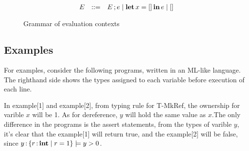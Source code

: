 \documentclass[runningheads]{llncs}
\begin{document}
\begin{figure}
\[
  \begin{array}{rcl}
    E & ::= & E \operatorname{;} e \mid \operatorname{\mathbf{let}} x = [] \operatorname{\mathbf{in}} e \mid []
  \end{array}
\]
\label{fig:eval-context-grammar}
\caption{Grammar of evaluation contexts}
\end{figure}

\subsection{Examples}
For examples, consider the following programs, written in an ML-like language.
The righthand side shows the types assigned to each variable before execution of
each line.
\begin{parcolumns}{2}
\colplacechunks
\end{parcolumns}

\begin{parcolumns}{2}
\colplacechunks
\end{parcolumns}

In example[1] and example[2], from typing rule for T-MkRef, the ownership for varible $x$ will be 1.
As for dereference, $y$ will hold the same value as $x$.The only difference in the programs is the
assert statements, from the types of varible $y$, it's clear that the example[1] will return true,
and the example[2] will be false, since $y \operatorname{:} \left\{{r \operatorname{:} \mathbf{int} \mid r = 1}\right\} \models y > 0$.
\end{document}
